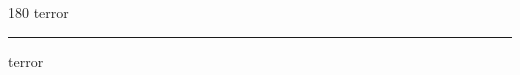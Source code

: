 
\begin{frame}
\begin{center}
\begin{turn}{180}
{\fontsize{2.5cm}{1em}\selectfont terror}
\end{turn}
\vspace{1em}\par  
\hrule
\vspace{1em}\par  
{\fontsize{2.5cm}{1em}\selectfont terror}
\end{center}
\end{frame}
